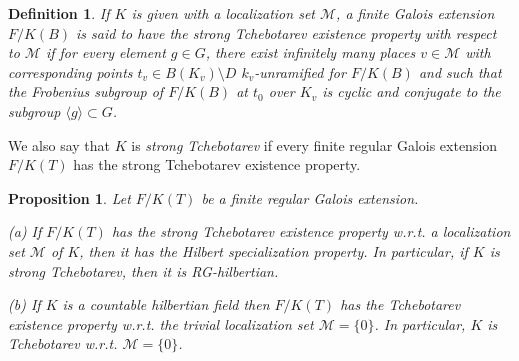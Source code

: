 \documentclass[12pt,english]{amsart}
\newtheorem{twisting lemma}[theorem]{Twisting lemma}
\newtheorem{proposition}[theorem]{Proposition}
\newtheorem{definition}[theorem]{Definition}
\begin{document}
\begin{definition} \label{def:strongtchebotarev}
If $K$ is given with a localization set ${\mathcal M}$, a finite Galois extension $F/K(B)$ is said to have the {\it strong Tchebotarev existence property with respect to ${\mathcal M}$} if for every element $g\in G$, there exist {\it infinitely many places} $v\in {\mathcal M}$  
with corresponding 
points $t_v\in B(K_v)\setminus D$ $k_v$-unramified for $F/K(B)$ and such that the Frobenius subgroup of $F/K(B)$ at $t_0$ over $K_v$ is cyclic and conjugate to the subgroup $\langle g\rangle\subset G$.  \end{definition}

We also say that  $K$ is {\it strong Tchebotarev} if every finite regular Galois extension $F/K(T)$ has the strong Tchebotarev existence property. 

\begin{proposition} \label{prop:strongTch-impliesRGH}
Let $F/K(T)$ be a finite regular Galois extension.
\vskip 1mm

\noindent
{\rm (a)} If $F/K(T)$ has the strong Tchebotarev existence property w.r.t. a localization set ${\mathcal M}$ of $K$, then it has the Hilbert specialization property. In particular, if $K$ is {\it strong Tchebotarev}, then it is RG-hilbertian.
\vskip 1mm

\noindent
{\rm (b)} If $K$ is a countable hilbertian field then $F/K(T)$ has the Tchebotarev existence property
w.r.t. the trivial localization set ${\mathcal M}=\{0\}$.  In particular, $K$ is {\it Tchebotarev} w.r.t.  ${\mathcal M}=\{0\}$.
\end{proposition}
\end{document}
